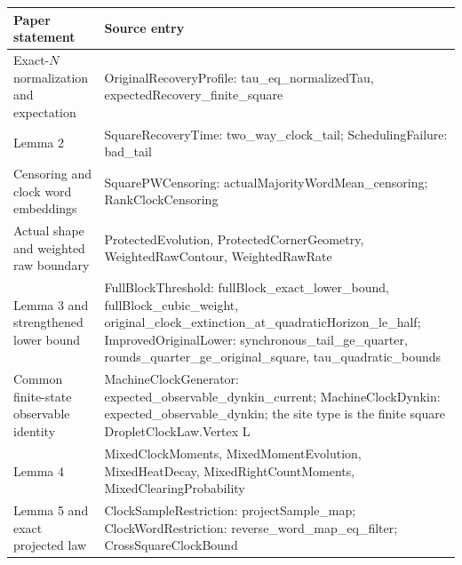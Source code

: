 \documentclass[
  11pt,
  a4paper,
]{article}
\begin{document}
\begin{longtable}[]{@{}
  >{\raggedright\arraybackslash}p{}
  >{\raggedright\arraybackslash}p{}@{}}
\toprule\noalign{}
\begin{minipage}[b]{\linewidth}\raggedright
Paper statement
\end{minipage} & \begin{minipage}[b]{\linewidth}\raggedright
Source entry
\end{minipage} \\
\midrule\noalign{}
\endhead
\bottomrule\noalign{}
\endlastfoot
Exact-\(N\) normalization and expectation & OriginalRecoveryProfile:
tau\_\allowbreak eq\_\allowbreak normalizedTau, expectedRecovery\_\allowbreak finite\_\allowbreak square \\
Lemma 2 & SquareRecoveryTime: two\_\allowbreak way\_\allowbreak clock\_\allowbreak tail; SchedulingFailure:
bad\_\allowbreak tail \\
Censoring and clock word embeddings & SquarePWCensoring:
actualMajorityWordMean\_\allowbreak censoring; RankClockCensoring \\
Actual shape and weighted raw boundary & ProtectedEvolution,
ProtectedCornerGeometry, WeightedRawContour, WeightedRawRate \\
Lemma 3 and strengthened lower bound & FullBlockThreshold:
fullBlock\_\allowbreak exact\_\allowbreak lower\_\allowbreak bound, fullBlock\_\allowbreak cubic\_\allowbreak weight,
original\_\allowbreak clock\_\allowbreak extinction\_\allowbreak at\_\allowbreak quadraticHorizon\_\allowbreak le\_\allowbreak half;
ImprovedOriginalLower: synchronous\_\allowbreak tail\_\allowbreak ge\_\allowbreak quarter,
rounds\_\allowbreak quarter\_\allowbreak ge\_\allowbreak original\_\allowbreak square, tau\_\allowbreak quadratic\_\allowbreak bounds \\
Common finite-state observable identity & MachineClockGenerator:
expected\_\allowbreak observable\_\allowbreak dynkin\_\allowbreak current; MachineClockDynkin:
expected\_\allowbreak observable\_\allowbreak dynkin; the site type is the finite square
DropletClockLaw.Vertex L \\
Lemma 4 & MixedClockMoments, MixedMomentEvolution, MixedHeatDecay,
MixedRightCountMoments, MixedClearingProbability \\
Lemma 5 and exact projected law & ClockSampleRestriction:
projectSample\_\allowbreak map; ClockWordRestriction:
reverse\_\allowbreak word\_\allowbreak map\_\allowbreak eq\_\allowbreak filter; CrossSquareClockBound \\

\end{longtable}
\end{document}
